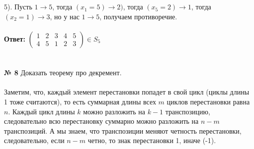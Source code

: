 \documentclass[a4paper, 12pt]{article}
\begin{document}
    \\
    \\ 5). Пусть $1 \to 5$, тогда $(x_1 = 5) \to 2)$, тогда $(x_5 = 2) \to 1$, тогда $(x_2 = 1) \to 3$, но у нас $1 \to 5$, получаем противоречие.
    \\
    \\ \textbf{Ответ: } $\begin{pmatrix}1 & 2 & 3 & 4 & 5\\4 & 5 & 1 & 2 & 3\end{pmatrix} \in S_5$
    \\\\
    \\ \textbf{№ 8} Доказать теорему про декремент.
    \\
    \\ Заметим, что, каждый элемент перестановки попадет в свой цикл (циклы длины 1 тоже считаются), то есть суммарная длины всех $m$ циклов перестановки равна $n$. Каждый цикл длины $k$ можно разложить на $k - 1$ транспозицию, следовательно всю перестановку суммарно можно разложить на $n - m$ транспозиций. А мы знаем, что транспозиции меняют четность перестановки, следовательно, если $n - m$ четно, то знак перестановки 1, иначе (-1).
\end{document}
